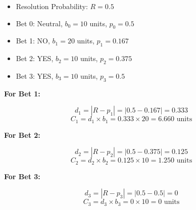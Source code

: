 \documentclass{article}
\begin{document}
\begin{itemize}
  \item Resolution Probability: \( R = 0.5 \)
  \item Bet 0: Neutral, \( b_0 = 10 \) units, \( p_0 = 0.5 \)
  \item Bet 1: NO, \( b_1 = 20 \) units, \( p_1 = 0.167 \)
  \item Bet 2: YES, \( b_2 = 10 \) units, \( p_2 = 0.375 \)
  \item Bet 3: YES, \( b_3 = 10 \) units, \( p_3 = 0.5 \)
\end{itemize}

\textbf{For Bet 1:}

\[
d_1 = |R - p_1| = |0.5 - 0.167| = 0.333
\]
\[
C_1 = d_1 \times b_1 = 0.333 \times 20 = 6.660 \text{ units}
\]

\textbf{For Bet 2:}

\[
d_2 = |R - p_2| = |0.5 - 0.375| = 0.125
\]
\[
C_2 = d_2 \times b_2 = 0.125 \times 10 = 1.250 \text{ units}
\]

\textbf{For Bet 3:}

\[
d_3 = |R - p_3| = |0.5 - 0.5| = 0
\]
\[
C_3 = d_3 \times b_3 = 0 \times 10 = 0 \text{ units}
\]
\end{document}
